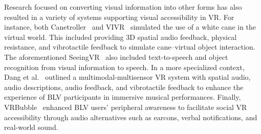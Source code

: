 Research focused on converting visual information into other forms has also resulted in a variety of systems supporting visual accessibility in VR. For instance, both Canetroller~\cite{canetroller} and VIVR~\cite{kim2020vivr} simulated the use of a white cane in the virtual world. This included providing 3D spatial audio feedback, physical resistance, and vibrotactile feedback to simulate cane--virtual object interaction. The aforementioned SeeingVR~\cite{zhao2019seeingvr} also included text-to-speech and object recognition from visual information to speech. In a more specialized context, Dang et al.~\cite{dang2023opportunities} outlined a multimodal-multisensor VR system with spatial audio, audio descriptions, audio feedback, and vibrotactile feedback to enhance the experience of BLV participants in immersive musical performances. 
Finally, VRBubble~\cite{ji2022vrbubble} enhanced BLV users' peripheral awareness to facilitate social VR accessibility through audio alternatives such as earcons, verbal notifications, and real-world sound.




